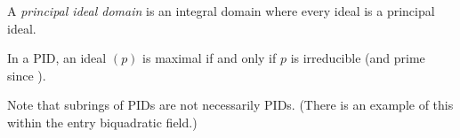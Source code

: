 \documentclass[12pt]{article}
\begin{document}
A \emph{principal ideal domain} is an integral domain where every
ideal is a principal ideal.

In a PID, an ideal $(p)$ is maximal if and only if $p$ is irreducible
(and prime since ).

Note that subrings of PIDs are not necessarily PIDs.  (There is
an example of this within the entry biquadratic field.)

\end{document}
